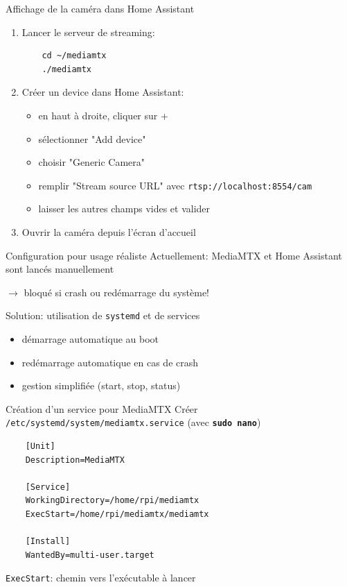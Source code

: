 \documentclass[
aspectratio=169 %
]{beamer}
\newcommand{\cmd}[1]{\texttt{\textbf{#1}}}
\begin{document}
\begin{frame}[fragile]{Affichage de la caméra dans Home Assistant}
    \begin{enumerate}
        \item Lancer le serveur de streaming:
              \begin{lstlisting}
    cd ~/mediamtx
    ./mediamtx \end{lstlisting}

        \item Créer un device dans Home Assistant:
              \begin{itemize}
                  \item en haut à droite, cliquer sur +
                  \item sélectionner "Add device"
                  \item choisir "Generic Camera"
                  \item remplir "Stream source URL" avec
                        \texttt{rtsp://localhost:8554/cam}
                  \item laisser les autres champs vides et valider
              \end{itemize}

        \item Ouvrir la caméra depuis l'écran d'accueil
    \end{enumerate}

\end{frame}

\begin{frame}{Configuration pour usage réaliste}
    Actuellement: MediaMTX et Home Assistant sont lancés manuellement

    \medskip
    \(\rightarrow\) bloqué si crash ou redémarrage du système!

    \bigskip
    \bigskip
    \alert{Solution}: utilisation de \texttt{systemd} et de services
    \begin{itemize}
        \item démarrage automatique au boot
        \item redémarrage automatique en cas de crash
        \item gestion simplifiée (start, stop, status)
    \end{itemize}
\end{frame}

\begin{frame}[fragile]{Création d'un service pour MediaMTX}
    Créer \texttt{/etc/systemd/system/mediamtx.service} (avec \cmd{sudo nano})

    \begin{lstlisting}
    [Unit]
    Description=MediaMTX

    [Service]
    WorkingDirectory=/home/rpi/mediamtx
    ExecStart=/home/rpi/mediamtx/mediamtx

    [Install]
    WantedBy=multi-user.target\end{lstlisting}

    \medskip
    \texttt{ExecStart}: chemin vers l'exécutable à lancer

\end{frame}
\end{document}
